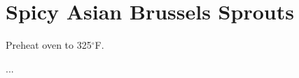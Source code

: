 \section{Spicy Asian Brussels Sprouts}
\begin{recipe}




	Preheat oven to 325$^{\circ}$F.

	...



\end{recipe}
